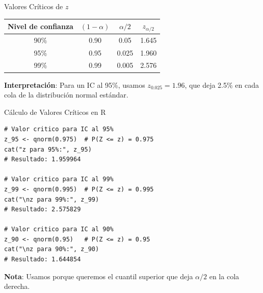 \documentclass[aspectratio=169, 11pt]{beamer}
\begin{document}
\begin{frame}{Valores Críticos de $z$}
\begin{table}
\centering
\begin{tabular}{cccc}
\toprule
\textbf{Nivel de confianza} & $(1-\alpha)$ & $\alpha/2$ & $z_{\alpha/2}$ \\
\midrule
90\% & 0.90 & 0.05 & 1.645 \\
95\% & 0.95 & 0.025 & 1.960 \\
99\% & 0.99 & 0.005 & 2.576 \\
\bottomrule
\end{tabular}
\end{table}

\vspace{0.3cm}
\textbf{Interpretación}: Para un IC al 95\%, usamos $z_{0.025} = 1.96$, que deja 2.5\% en cada cola de la distribución normal estándar.

\vspace{0.3cm}
\begin{center}
\end{center}
\end{frame}

\begin{frame}[fragile]{Cálculo de Valores Críticos en R}
\begin{lstlisting}
# Valor critico para IC al 95%
z_95 <- qnorm(0.975)  # P(Z <= z) = 0.975
cat("z para 95%:", z_95)
# Resultado: 1.959964

# Valor critico para IC al 99%
z_99 <- qnorm(0.995)  # P(Z <= z) = 0.995
cat("\nz para 99%:", z_99)
# Resultado: 2.575829

# Valor critico para IC al 90%
z_90 <- qnorm(0.95)   # P(Z <= z) = 0.95
cat("\nz para 90%:", z_90)
# Resultado: 1.644854
\end{lstlisting}

\vspace{0.3cm}
\textbf{Nota}: Usamos  porque queremos el cuantil superior que deja $\alpha/2$ en la cola derecha.
\end{frame}
\end{document}
